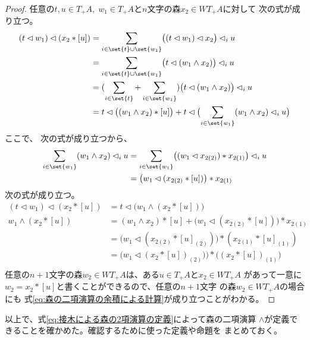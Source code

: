 \begin{itemize}
\begin{proof}
				任意の$t,u\in T_+A,\;w_1\in T_+A$と$n$文字の森$x_2\in WT_+A$に対して
				次の式が成り立つ。
				\begin{equation*}\begin{split} %
					(t\lhd w_1)\lhd (x_2*[u])
					&= \sum_{i\in \set{t}\cup\set{w_1}}
						\bigl((t\lhd w_1)\lhd x_2\bigr)\lhd_i u \\
					&= \sum_{i\in \set{t}\cup\set{w_1}}
						\bigl(t\lhd (w_1\land x_2)\bigr)\lhd_i u \\
					&= (\sum_{i\in \set{t}}+\sum_{i\in \set{w_1}})
						\bigl(t\lhd (w_1\land x_2)\bigr)\lhd_i u \\
					&= t\lhd \bigl((w_1\land x_2)*[u]\bigr)
						+ t\lhd \bigl(\sum_{i\in \set{w_1}}(w_1\land x_2)\lhd_i u\bigr) \\
				\end{split}\end{equation*} %
				ここで、 次の式が成り立つから、
				\begin{equation*}\begin{split} %
					\sum_{i\in \set{w_1}}(w_1\land x_2)\lhd_i u
					&= \sum_{i\in \set{w_1}}\bigl((w_1\lhd x_{2(2)})*x_{2(1)}\bigr)\lhd_i u \\
					&= \bigl(w_1\lhd (x_{2(2)}*[u])\bigr)*x_{2(1)} \\
				\end{split}\end{equation*} %
				次の式が成り立つ。
				\begin{equation*}\begin{split} %
					(t\lhd w_1)\lhd (x_2*[u])
					&= t\lhd \bigl(w_1\land (x_2*[u])\bigr) \\
					w_1\land (x_2*[u])
					&= (w_1\land x_2)*[u]+\bigl(w_1\lhd (x_{2(2)}*[u])\bigr)*x_{2(1)} \\
					&= \bigl(w_1\lhd (x_{2(2)}*[u]_{(2)})\bigr)*(x_{2(1)}*[u]_{(1)}) \\
					&= \bigl(w_1\lhd (x_2*[u])_{(2)})\bigr)*\bigl((x_2*[u])_{(1)}\bigr) \\
				\end{split}\end{equation*} %
				任意の$n+1$文字の森$w_2\in WT_+A$は、ある$u\in T_+A$と$x_2\in WT_+A$
				があって一意に$w_2=x_2*[u]$と書くことができるので、任意の$n+1$文字
				の森$w_2\in WT_+A$の場合にも
				式\eqref{eq:森の二項演算の余積による計算}が成り立つことがわかる。
			\end{proof} %
		\end{itemize} %
		以上で、式\eqref{eq:接木による森の2項演算の定義}によって森の二項演算
		$\land$が定義できることを確かめた。確認するために使った定義や命題を
		まとめておく。

